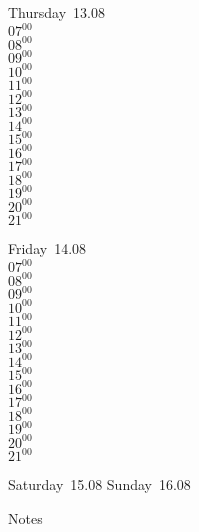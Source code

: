 \documentclass[11pt,a4paper]{book}\usepackage[]{graphicx}\usepackage[]{color}
\begin{document}
\clearpage
\begin{headerbox}
\end{headerbox}
\begin{weekdaybox}
  Thursday~13.08\\
  { 
  \vfill
  $07^{00}$\\
$08^{00}$\\
$09^{00}$\\
$10^{00}$\\
$11^{00}$\\
$12^{00}$\\
$13^{00}$\\
$14^{00}$\\
$15^{00}$\\
$16^{00}$\\
$17^{00}$\\
$18^{00}$\\
$19^{00}$\\
$20^{00}$\\
$21^{00}$\\
  }
\end{weekdaybox} 
\begin{weekdaybox}
  Friday~14.08\\
  { 
  \vfill
  $07^{00}$\\
$08^{00}$\\
$09^{00}$\\
$10^{00}$\\
$11^{00}$\\
$12^{00}$\\
$13^{00}$\\
$14^{00}$\\
$15^{00}$\\
$16^{00}$\\
$17^{00}$\\
$18^{00}$\\
$19^{00}$\\
$20^{00}$\\
$21^{00}$\\
  }
\end{weekdaybox}
\begin{weekendbox}
  Saturday~15.08
  \tcblower
  Sunday~16.08
\end{weekendbox} %
\begin{notebox}
  Notes
\end{notebox}
\clearpage
\end{document}
